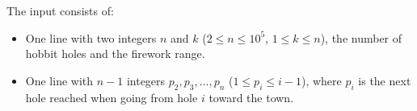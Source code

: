 
    The input consists of:
    \begin{itemize}
        \item One line with two integers $n$ and $k$ ($2 \leq n \leq 10^5$, $1 \le k \le n$), the number of hobbit holes and the firework range.
        \item One line with $n-1$ integers $p_2, p_3, \ldots, p_n$ ($1 \le p_i \leq i-1$), where $p_i$ is the next hole reached when going from hole $i$ toward the town.
    \end{itemize}
